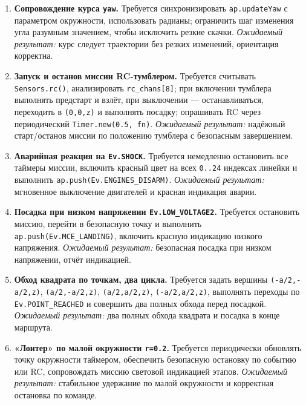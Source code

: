 \begin{enumerate}
    \textit{Ожидаемый результат:} плавный подъём до \texttt{z\_max}, возврат к базе и посадка.
  \item \textbf{Сопровождение курса \texttt{yaw}.}
    Требуется синхронизировать \texttt{ap.updateYaw} с параметром окружности, использовать радианы; ограничить шаг изменения угла разумным значением, чтобы исключить резкие скачки.
    \textit{Ожидаемый результат:} курс следует траектории без резких изменений, ориентация корректна.
  \item \textbf{Запуск и останов миссии RC-тумблером.}
    Требуется считывать \texttt{Sensors.rc()}, анализировать \texttt{rc\_chans[8]}; при включении тумблера выполнять предстарт и взлёт, при выключении — останавливаться, переходить в \texttt{(0,0,z)} и выполнять посадку; опрашивать RC через периодический \texttt{Timer.new(0.5, fn)}.
    \textit{Ожидаемый результат:} надёжный старт/останов миссии по положению тумблера с безопасным завершением.
  \item \textbf{Аварийная реакция на \texttt{Ev.SHOCK}.}
    Требуется немедленно остановить все таймеры миссии, включить красный цвет на всех \texttt{0..24} индексах линейки и выполнить \texttt{ap.push(Ev.ENGINES\_DISARM)}.
    \textit{Ожидаемый результат:} мгновенное выключение двигателей и красная индикация аварии.
  \item \textbf{Посадка при низком напряжении \texttt{Ev.LOW\_VOLTAGE2}.}
    Требуется остановить миссию, перейти в безопасную точку и выполнить \texttt{ap.push(Ev.MCE\_LANDING)}, включить красную индикацию низкого напряжения.
    \textit{Ожидаемый результат:} безопасная посадка при низком напряжении, отчёт индикацией.
  \item \textbf{Обход квадрата по точкам, два цикла.}
    Требуется задать вершины \texttt{(-a/2,-a/2,z)}, \texttt{(a/2,-a/2,z)}, \texttt{(a/2,a/2,z)}, \texttt{(-a/2,a/2,z)}, выполнять переходы по \texttt{Ev.POINT\_REACHED} и совершить два полных обхода перед посадкой.
    \textit{Ожидаемый результат:} два полных обхода квадрата и посадка в конце маршрута.
  \item \textbf{«Лоитер» по малой окружности \texttt{r=0.2}.}
    Требуется периодически обновлять точку окружности таймером, обеспечить безопасную остановку по событию или RC, сопровождать миссию световой индикацией этапов.
    \textit{Ожидаемый результат:} стабильное удержание по малой окружности и корректная остановка по команде.
\end{enumerate}

